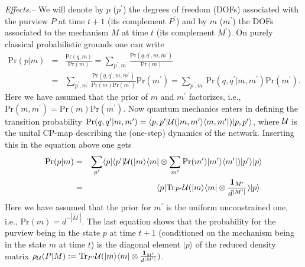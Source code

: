 \documentclass[aps,pra,groupaddress]{revtex4-1}
\begin{document}
{\em {Effects.--}}
We will denote by $p$ ($p^\prime$) the degrees of freedom (DOFs)
associated with the purview $P$ at time $t+1$ (its complement
$P^\prime$) and by $m$ ($m^\prime$) the DOFs associated to the
mechanism $M$ at time $t$ (its complement $M^\prime$).
On purely classical probabilistic grounds one can write
\begin{eqnarray}
{\mathrm{Pr}}(p|m)&=&\frac{ {\mathrm{Pr}}(q,m) }{{\mathrm{Pr}}(m)} =\sum_{p^\prime,m^\prime}\frac{ {\mathrm{Pr}}(q,q^\prime, m, m^\prime) }{{\mathrm{Pr}}(m)} \nonumber \\
&=& \sum_{p^\prime,m^\prime}\frac{ {\mathrm{Pr}}(q,q^\prime, m, m^\prime) }{{\mathrm{Pr}}(m) {\mathrm{Pr}}(m^\prime)  }{\mathrm{Pr}}(m^\prime)=
\sum_{p^\prime,m^\prime}{ {\mathrm{Pr}}(q,q^\prime| m, m^\prime) }{\mathrm{Pr}}(m^\prime).
\end{eqnarray}
Here we have assumed that the prior of $m$ and $m^\prime$ factorizes,
i.e.,
${\mathrm{Pr}}( m, m^\prime)=  {\mathrm{Pr}}( m) {\mathrm{Pr}}( m^\prime)$. 
Now quantum mechanics enters in defining the transition probability
${\mathrm{Pr}}(q,q^\prime| m, m^\prime)= \langle p, p^\prime|{\cal U}(|m,m^\prime\rangle\langle m,m^\prime |)|p, p^\prime\rangle$,
where ${\cal U}$ is the unital CP-map describing the (one-step)
dynamics of the network.
Inserting this in the equation above one gets
\begin{eqnarray}
{\mathrm{Pr}}(p|m)&=& \sum_{p^\prime} \langle p|\langle p^\prime| {\cal U}(|m\rangle\langle m|\otimes \sum_{m^\prime}    {\mathrm{Pr}}( m^\prime) |m^\prime\rangle\langle m^\prime|  )|p^\prime\rangle |p\rangle \nonumber \\
& =&\langle p| {\mathrm{Tr}}_{P^\prime} {\cal U}(|m\rangle\langle m|\otimes \frac{  {\mathbf{1}}_{M^\prime}  }{ d^{|M^\prime|}   })|p\rangle.
\label{effect-rep}
\end{eqnarray}
Here we have assumed that the prior for $m^\prime$ is the uniform
unconstrained one, i.e., ${\mathrm{Pr}}(m)=d^{-|M^\prime|}$.
The last equation shows that the probability for the purview being in
the state $p$ at time $t+1$
(conditioned on the mechanism being in the state $m$ at time $t$)
is the diagonal element $|p\rangle$ of the reduced density matrix
$\rho_{\cal U}(P|M):=  {\mathrm{Tr}}_{P^\prime} {\cal U}(|m\rangle\langle m|\otimes \frac{  {\mathbf{1}}_{M^\prime}  }{ d^{|M^\prime|}   })$.
\end{document}
